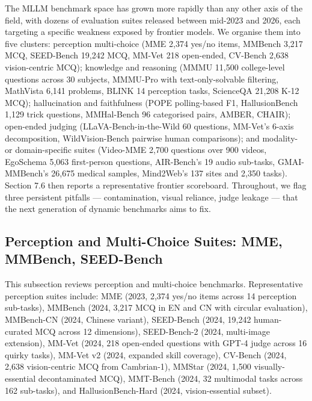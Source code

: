 \documentclass{article}
\begin{document}
The MLLM benchmark space has grown more rapidly than any other axis of the field, with dozens of evaluation suites released between mid-2023 and 2026, each targeting a specific weakness exposed by frontier models. We organise them into five clusters: perception multi-choice (MME 2,374 yes/no items, MMBench 3,217 MCQ, SEED-Bench 19,242 MCQ, MM-Vet 218 open-ended, CV-Bench 2,638 vision-centric MCQ); knowledge and reasoning (MMMU 11,500 college-level questions across 30 subjects, MMMU-Pro with text-only-solvable filtering, MathVista 6,141 problems, BLINK 14 perception tasks, ScienceQA 21,208 K-12 MCQ); hallucination and faithfulness (POPE polling-based F1, HallusionBench 1,129 trick questions, MMHal-Bench 96 categorised pairs, AMBER, CHAIR); open-ended judging (LLaVA-Bench-in-the-Wild 60 questions, MM-Vet's 6-axis decomposition, WildVision-Bench pairwise human comparisons); and modality- or domain-specific suites (Video-MME 2,700 questions over 900 videos, EgoSchema 5,063 first-person questions, AIR-Bench's 19 audio sub-tasks, GMAI-MMBench's 26,675 medical samples, Mind2Web's 137 sites and 2,350 tasks). Section 7.6 then reports a representative frontier scoreboard. Throughout, we flag three persistent pitfalls --- contamination, visual reliance, judge leakage --- that the next generation of dynamic benchmarks aims to fix.

\subsection{Perception and Multi-Choice Suites: MME, MMBench, SEED-Bench}\label{perception-and-multi-choice-suites-mme-mmbench-seed-bench}

This subsection reviews perception and multi-choice benchmarks. Representative perception suites include: MME (2023, 2,374 yes/no items across 14 perception sub-tasks), MMBench (2024, 3,217 MCQ in EN and CN with circular evaluation), MMBench-CN (2024, Chinese variant), SEED-Bench (2024, 19,242 human-curated MCQ across 12 dimensions), SEED-Bench-2 (2024, multi-image extension), MM-Vet (2024, 218 open-ended questions with GPT-4 judge across 16 quirky tasks), MM-Vet v2 (2024, expanded skill coverage), CV-Bench (2024, 2,638 vision-centric MCQ from Cambrian-1), MMStar (2024, 1,500 visually-essential decontaminated MCQ), MMT-Bench (2024, 32 multimodal tasks across 162 sub-tasks), and HallusionBench-Hard (2024, vision-essential subset).
\end{document}

